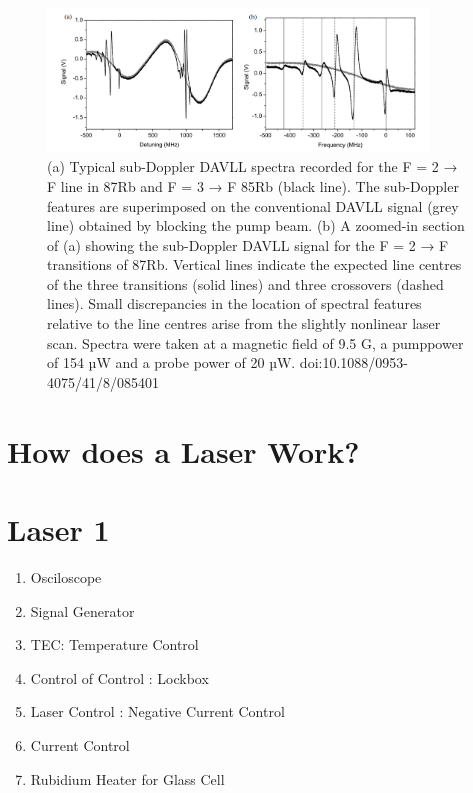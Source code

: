 \documentclass[10pt]{article}
\begin{document}
\begin{figure}[h]
    \centering
    \includegraphics[width=0.9\textwidth]{img/brrr.PNG}
    \caption{(a) Typical sub-Doppler DAVLL spectra recorded for the F = 2 → F line in 87Rb and F = 3 → F 85Rb (black line). The
    sub-Doppler features are superimposed on the conventional DAVLL signal (grey line) obtained by blocking the pump beam. (b) A
    zoomed-in section of (a) showing the sub-Doppler DAVLL signal for the F = 2 → F transitions of 87Rb. Vertical lines indicate the
    expected line centres of the three transitions (solid lines) and three crossovers (dashed lines). Small discrepancies in the location of spectral
    features relative to the line centres arise from the slightly nonlinear laser scan. Spectra were taken at a magnetic field of 9.5 G, a pumppower of 154 µW and a probe power of 20 µW. doi:10.1088/0953-4075/41/8/085401}
    \label{fig:curvas}
\end{figure}



\newpage
\section*{How does a Laser Work? }
\section*{Laser 1}



\begin{enumerate}
    \item Osciloscope
    \item Signal Generator
    \item TEC: Temperature Control
    \item Control of Control : Lockbox
    \item Laser Control : Negative Current Control
    \item Current Control %
    \item Rubidium Heater for Glass Cell
\end{enumerate}
\end{document}
